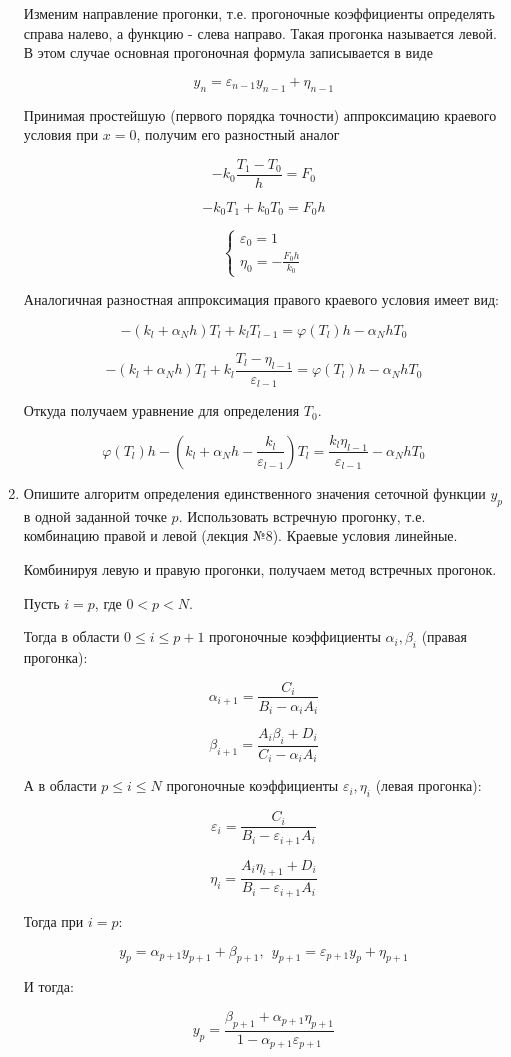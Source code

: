 \documentclass[a4paper,14pt]{extreport} %
\begin{document}
\begin{enumerate}
Изменим направление прогонки, т.е. прогоночные коэффициенты определять справа налево, а функцию - слева направо. Такая прогонка называется левой. В этом случае основная прогоночная формула записывается в виде

$$y_n=\varepsilon_{n-1}y_{n-1}+\eta_{n-1}$$

Принимая простейшую (первого порядка точности) аппроксимацию краевого условия при $x=0$, получим его разностный аналог

$$-k_0\frac{T_1-T_0}{h}=F_0$$

$$-k_0T_1+k_0T_0=F_0h$$

$$
 \begin{cases}
   \varepsilon_0=1
   \\
   \eta_0=-\frac{F_0h}{k_0}
 \end{cases}
$$

Аналогичная разностная аппроксимация правого краевого условия имеет вид:

$$-(k_l+\alpha_Nh)T_{l}+k_lT_{l-1}=\varphi(T_l)h-\alpha_NhT_0$$

$$-(k_l+\alpha_Nh)T_{l}+k_l\frac{T_{l}-\eta_{l-1}}{\varepsilon_{l-1}}=\varphi(T_l)h-\alpha_NhT_0$$

Откуда получаем уравнение для определения $T_0$. 

$$\varphi(T_l)h-(k_l+\alpha_Nh-\frac{k_l}{\varepsilon_{l-1}})T_l=\frac{k_l\eta_{l-1}}{\varepsilon_{l-1}}-\alpha_NhT_0$$

\item Опишите алгоритм определения единственного значения сеточной функции $y_p$ в одной заданной точке $p$. Использовать встречную прогонку, т.е. комбинацию правой и левой (лекция №8). Краевые условия линейные.

Комбинируя левую и правую прогонки, получаем метод встречных прогонок. 

Пусть $i=p$, где $0<p<N$. 

Тогда в области $0\le i \le p+1$ прогоночные коэффициенты $\alpha_i, \beta_i$ (правая прогонка):

$$\alpha_{i+1}=\frac{C_i}{B_i-\alpha_iA_i}$$

$$\beta_{i+1}=\frac{A_i\beta_i+D_i}{C_i-\alpha_iA_i}$$

А в области $p\le i \le N$ прогоночные коэффициенты $\varepsilon_i, \eta_i$ (левая прогонка):

$$\varepsilon_{i}=\frac{C_i}{B_i-\varepsilon_{i+1}A_i}$$

$$\eta_{i}=\frac{A_i\eta_{i+1}+D_i}{B_i-\varepsilon_{i+1}A_i}$$

Тогда при $i=p$:

$$y_p=\alpha_{p+1}y_{p+1}+\beta_{p+1},~~y_{p+1}=\varepsilon_{p+1}y_{p}+\eta_{p+1}$$

И тогда:

$$y_{p}=\frac{\beta_{p+1}+\alpha_{p+1}\eta_{p+1}}{1-\alpha_{p+1}\varepsilon_{p+1}}$$

\end{enumerate}
\end{document}
